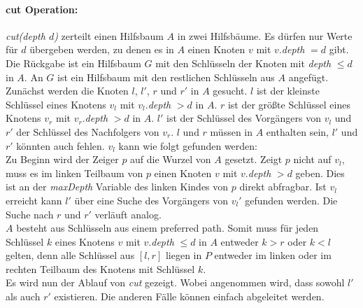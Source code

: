 \documentclass[a4paper,12pt]{article}
\begin{document}
\paragraph{cut Operation:} \label{cut}

\noindent \textit{cut(depth $d$)} zerteilt einen Hilfsbaum $A$ in zwei Hilfsbäume. Es dürfen nur Werte für $d$ übergeben werden, zu denen es in $A$ einen Knoten $v$ mit $v.$\textit{depth} $ = d $ gibt. Die Rückgabe ist ein Hilfsbaum $G$ mit den Schlüsseln der Knoten mit \textit{depth} $\leq d$ in $A$. An $G$ ist ein Hilfsbaum mit den restlichen Schlüsseln aus $A$ angefügt. Zunächst werden die Knoten $l$,  $l'$, $r$ und $r'$ in $A$ gesucht. $l$ ist der kleinste Schlüssel eines Knotens $v_l$ mit $v_l$.\textit{depth} $> d$  in $A$. $r$ ist der größte Schlüssel eines Knotens $v_r$ mit $v_r$.\textit{depth} $> d$  in $A$. $l'$ ist der Schlüssel des Vorgängers von $v_l$ und $r'$ der Schlüssel des Nachfolgers von $v_r$. $l$ und $r$ müssen in $A$ enthalten sein, $l'$ und $r'$ könnten auch fehlen. $v_l$ kann wie folgt gefunden werden:\\ Zu Beginn wird der Zeiger $p$ auf die Wurzel von $A$ gesetzt. Zeigt $p$ nicht auf $v_l$, muss es im linken Teilbaum von $p$ einen Knoten $v$ mit $v$.\textit{depth} $> d$ geben. Dies ist an der \textit{maxDepth} Variable des linken Kindes von $p$ direkt abfragbar. Ist $v_l$ erreicht kann $l'$ über eine Suche des Vorgängers von $v_l'$ gefunden werden. Die Suche nach $r$ und $r'$ verläuft analog. \\
$A$ besteht aus Schlüsseln aus einem preferred path. Somit muss für jeden Schlüssel $k$ eines Knotens $v$ mit $v$.\textit{depth} $\leq d$ in $A$ entweder $k > r$ oder $k < l$ gelten, denn alle Schlüssel aus $\left[l,r\right]$ liegen in $P$ entweder im linken oder im rechten Teilbaum des Knotens mit Schlüssel $k$. \\
Es wird nun der Ablauf von \textit{cut} gezeigt. Wobei angenommen wird, dass sowohl $l'$ als auch $r'$ existieren. Die anderen Fälle können einfach abgeleitet werden.
\end{document}
